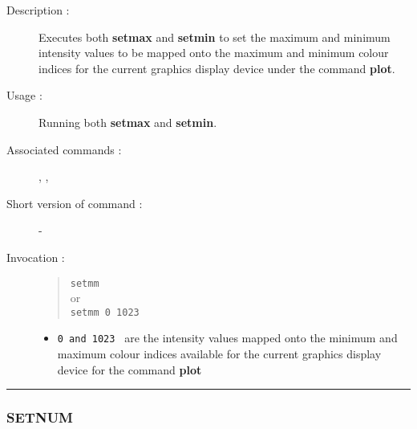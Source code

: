 \begin{description}

\item[Description :] Executes both {\bf setmax} and {\bf setmin} to set
the maximum and minimum intensity values to be mapped onto the maximum
and minimum colour indices for the current graphics display device
under the command {\bf plot}.

\item[Usage :] Running both {\bf setmax} and {\bf setmin}.

\item[Associated commands :] {\tt {}}, 
{\tt {}}, {\tt {}}

\item[Short version of command :] -
\item[Invocation :]

\begin{quote}{\tt  setmm }\\
or \\
{\tt setmm 0 1023 }
\end{quote}

\begin{itemize}

\item {\tt 0 and 1023 } are the intensity values mapped onto the
minimum and maximum colour indices available for the current graphics
display device for the command {\bf plot}

\end{itemize}

\end{description}

\hrule 
\subsubsection*{\label{SETNUM}SETNUM}

